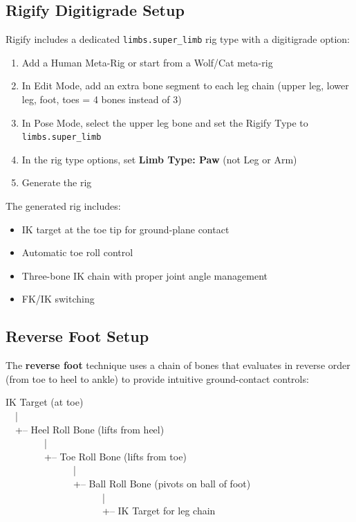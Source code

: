 \subsection{Rigify Digitigrade Setup}

Rigify includes a dedicated \texttt{limbs.super\_limb} rig type with a digitigrade option:

\begin{enumerate}[leftmargin=2em]
  \item Add a Human Meta-Rig or start from a Wolf/Cat meta-rig
  \item In Edit Mode, add an extra bone segment to each leg chain (upper leg, lower leg, foot, toes = 4 bones instead of 3)
  \item In Pose Mode, select the upper leg bone and set the Rigify Type to \texttt{limbs.super\_limb}
  \item In the rig type options, set \textbf{Limb Type: Paw} (not Leg or Arm)
  \item Generate the rig
\end{enumerate}

The generated rig includes:

\begin{itemize}[leftmargin=2em]
  \item IK target at the toe tip for ground-plane contact
  \item Automatic toe roll control
  \item Three-bone IK chain with proper joint angle management
  \item FK/IK switching
\end{itemize}

\subsection{Reverse Foot Setup}

The \textbf{reverse foot} technique uses a chain of bones that evaluates in reverse order (from toe to heel to ankle) to provide intuitive ground-contact controls:

\begin{codebox}
IK Target (at toe)\\
~~|\\
~~+-- Heel Roll Bone (lifts from heel)\\
~~~~~~~~|\\
~~~~~~~~+-- Toe Roll Bone (lifts from toe)\\
~~~~~~~~~~~~~~|\\
~~~~~~~~~~~~~~+-- Ball Roll Bone (pivots on ball of foot)\\
~~~~~~~~~~~~~~~~~~~~|\\
~~~~~~~~~~~~~~~~~~~~+-- IK Target for leg chain
\end{codebox}

